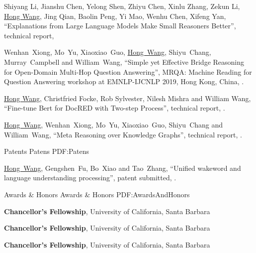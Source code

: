 \documentclass[letterpaper,MMMyyyy,nonstopmode]{simpleresumecv}
\begin{document}
\begin{Body}
\begin{enumerate}[label={[\arabic*]~~}]
\item
Shiyang Li, Jianshu Chen, Yelong Shen, Zhiyu Chen, Xinlu Zhang, Zekun Li, \underline{Hong Wang}, Jing Qian, Baolin Peng, Yi Mao, Wenhu Chen, Xifeng Yan,
``Explanations from Large Language Models Make Small Reasoners Better'',
technical report,

\item
Wenhan~Xiong, Mo~Yu, Xiaoxiao~Guo, \underline{Hong~Wang}, Shiyu~Chang, Murray~Campbell and William~Wang,
``Simple yet Effective Bridge Reasoning for Open-Domain Multi-Hop Question Answering'',
MRQA: Machine Reading for Question Answering workshop at EMNLP-IJCNLP 2019, Hong Kong, China,
.

\item
\underline{Hong Wang}, Christfried Focke, Rob Sylvester, Nilesh Mishra and William Wang,
``Fine-tune Bert for DocRED with Two-step Process'',
technical report,
.

\item
\underline{Hong~Wang}, Wenhan~Xiong, Mo~Yu, Xiaoxiao~Guo, Shiyu~Chang and William~Wang,
``Meta Reasoning over Knowledge Graphs'',
technical report,
.
\end{enumerate}


\Section
{Patents}
{Patens}
{PDF:Patens}

\begin{enumerate}[label={[\arabic*]~~}]
\item
\underline{Hong~Wang}, Gengshen~Fu, Bo~Xiao and Tao~Zhang,
``Unified wakeword and language understanding processing'', patent submitted,
.
\end{enumerate}



\Section
{Awards \&\newline
Honors}
{Awards \& Honors}
{PDF:AwardsAndHonors}

\Entry
\textbf{Chancellor's Fellowship}, University of California, Santa Barbara
\hfill
{}

\Entry
\textbf{Chancellor's Fellowship}, University of California, Santa Barbara
\hfill
{}

\Gap
\Entry
\textbf{Chancellor's Fellowship}, University of California, Santa Barbara
\hfill
{}


\end{Body}
\end{document}
